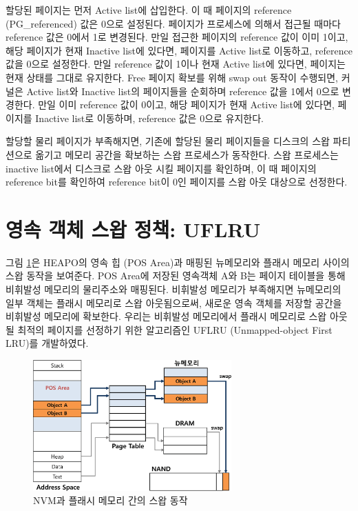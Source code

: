 \documentclass[letterpaper,twocolumn,10pt]{article}
\begin{document}
할당된 페이지는 먼저 Active list에 삽입한다. 이 때 페이지의 reference (PG\_referenced) 값은 0으로 설정된다. 페이지가 프로세스에 의해서 접근될 때마다 reference 값은 0에서 1로 변경된다. 만일 접근한 페이지의 reference 값이 이미 1이고, 해당 페이지가 현재 Inactive list에 있다면, 페이지를 Active list로 이동하고, reference 값을 0으로 설정한다. 만일 reference 값이 1이나 현재 Active list에 있다면, 페이지는 현재 상태를 그대로 유지한다. Free 페이지 확보를 위해 swap out 동작이 수행되면, 커널은 Active list와 Inactive list의 페이지들을 순회하며 reference 값을 1에서 0으로 변경한다. 만일 이미 reference 값이 0이고, 해당 페이지가 현재 Active list에 있다면, 페이지를 Inactive list로 이동하며, reference 값은 0으로 유지한다.

할당할 물리 페이지가 부족해지면, 기존에 할당된 물리 페이지들을 디스크의 스왑 파티션으로 옮기고 메모리 공간을 확보하는 스왑 프로세스가 동작한다. 스왑 프로세스는 inactive list에서 디스크로 스왑 아웃 시킬 페이지를 확인하며, 이 때 페이지의 reference bit를 확인하여 reference bit이 0인 페이지를 스왑 아웃 대상으로 선정한다.

\section{영속 객체 스왑 정책: UFLRU}

그림 \ref{fig:swap_flow}은 HEAPO의 영속 힙 (POS Area)과 매핑된 뉴메모리와 플래시 메모리 사이의 스왑 동작을 보여준다. POS Area에 저장된 영속객체 A와 B는 페이지 테이블을 통해 비휘발성 메모리의 물리주소와 매핑된다. 비휘발성 메모리가 부족해지면 뉴메모리의 일부 객체는 플래시 메모리로 스왑 아웃됨으로써, 새로운 영속 객체를 저장할 공간을 비휘발성 메모리에 확보한다. 우리는 비휘발성 메모리에서 플래시 메모리로 스왑 아웃 될 최적의 페이지를 선정하기 위한 알고리즘인 UFLRU (Unmapped-object First LRU)를 개발하였다.

\begin{figure}[t]
\begin{center}
\includegraphics[width=3in]{./figure/swap_flow.eps}
\caption{NVM과 플래시 메모리 간의 스왑 동작}
\label{fig:swap_flow}
\end{center}
\end{figure}
\end{document}
